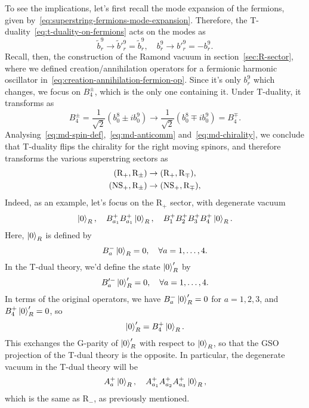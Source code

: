 To see the implications, let's first recall the mode expansion of the fermions, given by~\eqref{eq:superstring-fermions-mode-expansion}. Therefore, the T-duality~\eqref{eq:t-duality-on-fermions} acts on the modes as
\begin{equation}
    \tilde{b}^9_r \to \tilde{b}'^9_r = \tilde{b}^9_r, \quad b^9_r \to b'^9_r = - b^9_r .
\end{equation}
Recall, then, the construction of the Ramond vacuum in section~\eqref{sec:R-sector}, where we defined creation/annihilation operators for a fermionic harmonic oscillator in~\eqref{eq:creation-annihilation-fermion-op}. Since it's only $b^9_r$ which changes, we focus on $B^\pm_4$, which is the only one containing it. Under T-duality, it transforms as
\begin{equation}
    B^\pm_4 = \frac{1}{\sqrt{2}} \left( b^8_0 \pm i b^9_0 \right) \to \frac{1}{\sqrt{2}} \left( b^8_0 \mp i b^9_0 \right) = B^\mp_4.
\end{equation}
Analysing~\eqref{eq:md-spin-def},~\eqref{eq:md-anticomm} and~\eqref{eq:md-chirality}, we conclude that T-duality flips the chirality for the right moving spinors, and therefore transforms the various superstring sectors as
\begin{equation}
\begin{aligned}
    (\textup{R}_+, \textup{R}_\pm) &\to (\textup{R}_+, \textup{R}_\mp), \\
    (\textup{NS}_+, \textup{R}_\pm) &\to (\textup{NS}_+, \textup{R}_\mp),
\end{aligned}
\end{equation}
Indeed, as an example, let's focus on the R$_+$ sector, with degenerate vacuum
\begin{equation}
    \ket{0}_R, \quad B^+_{a_1} B^+_{a_1} \ket{0}_R, \quad B^+_1B^+_2 B^+_3 B^+_4 \ket{0}_R.
\end{equation}
Here, $\ket{0}_R$ is defined by
\begin{equation}
    B^-_a \ket{0}_R = 0, \quad \forall a = 1, \dots, 4.
\end{equation}
In the T-dual theory, we'd define the state $\ket{0}'_R$ by
\begin{equation}
    B'^-_a \ket{0}'_R = 0, \quad \forall a = 1, \dots, 4.
\end{equation}
In terms of the original operators, we have $B^-_a \ket{0}'_R = 0$ for $a=1,2,3$, and $B^+_4 \ket{0}'_R=0$, so
\begin{equation}
    \ket{0}'_R = B^+_4 \ket{0}_R .
\end{equation}
This exchanges the G-parity of $\ket{0}'_R$ with respect to $\ket{0}_R$, so that the GSO projection of the T-dual theory is the opposite. In particular, the degenerate vacuum in the T-dual theory will be
\begin{equation}
    A^+_a \ket{0}_R, \quad A^+_{a_1}A^+_{a_2}A^+_{a_3}\ket{0}_R,
\end{equation}
which is the same as R$_-$, as previously mentioned.

